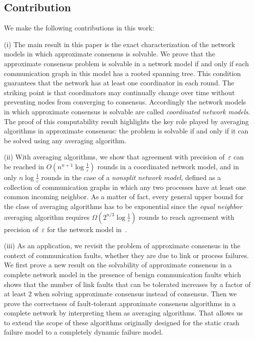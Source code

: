 \documentclass[a4paper]{article}
\theoremstyle{newthm}
\begin{document}
\subsection{Contribution}

We make the following contributions in this work:

(i) The main result in this paper is the exact characterization of the network models
	in which approximate consensus is solvable.
We prove that the approximate consensus problem is solvable in a network model
	if and only if each communication graph in this model has a rooted spanning tree.
This condition guarantees that 
	the network has at least one coordinator in each round.
The striking point is that 
	coordinators may continually change over time without preventing nodes
	from converging to consensus.
Accordingly the network models in which 
	approximate consensus is solvable are called {\em coordinated network models}.
The proof of this computability result highlights the key role played by averaging
	algorithms in approximate consensus: the problem is solvable if and only if
	it can be solved using any averaging algorithm.

(ii) With  averaging algorithms, we show that agreement with precision of~$\varepsilon$ can be reached in 
	$O \left ( n ^{n  + 1} \log \frac{1}{\varepsilon} \right )$ rounds  
	in a coordinated network model, and in only $n \log \frac{1}{\varepsilon} $ rounds
	in the case of  a {\em nonsplit network model}, defined as a collection
	of communication graphs in which any two processes have at least one common incoming neighbor.
As a matter of fact, every general upper bound
	for the class of averaging algorithms has to be exponential since  the {\em equal neighbor} averaging algorithm 
	requires $\Omega(2^{n/3}\log\frac{1}{\varepsilon})$ 
	rounds to reach agreement with precision of~$\varepsilon$
	for the network model in~\cite{OT11v1}.

	
(iii) As an application, we revisit the problem of approximate consensus in the
	context of communication faults, whether they are due to  link or process failures.
We  first prove a new result  on the solvability of approximate consensus in a complete  
	network model in the presence of benign communication faults which shows that the number 
	of link faults that can be tolerated increases by a factor of at least 2 
	when solving  approximate consensus instead of consensus.
Then we prove the correctness of  fault-tolerant 
	approximate consensus  algorithms in a complete network by 
	interpreting them as averaging algorithms.
That allows us to extend the scope of these algorithms originally designed for the static crash failure model
	to a completely dynamic failure model. 
	
\end{document}

